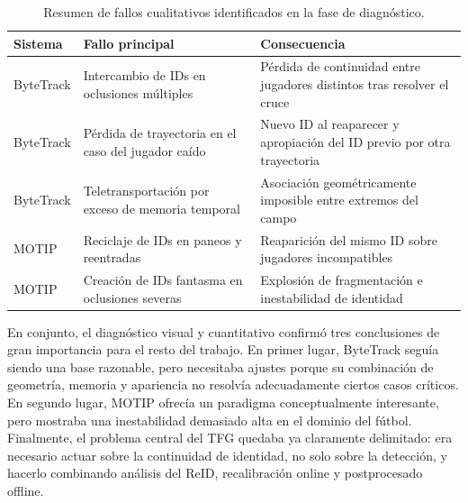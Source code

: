 \documentclass[../MAIN.tex]{subfiles}
\begin{document}
	\begin{table}[H]
		\centering
		\caption{Resumen de fallos cualitativos identificados en la fase de diagnóstico.}
		\label{tab:diagnostico_fallos}
		\begin{tabular}{p{3.2cm}p{4.8cm}p{5.3cm}}
			\toprule
			\textbf{Sistema} & \textbf{Fallo principal} & \textbf{Consecuencia} \\
			\midrule
			ByteTrack & Intercambio de IDs en oclusiones múltiples & Pérdida de continuidad entre jugadores distintos tras resolver el cruce \\
			ByteTrack & Pérdida de trayectoria en el caso del jugador caído & Nuevo ID al reaparecer y apropiación del ID previo por otra trayectoria \\
			ByteTrack & Teletransportación por exceso de memoria temporal & Asociación geométricamente imposible entre extremos del campo \\
			MOTIP & Reciclaje de IDs en paneos y reentradas & Reaparición del mismo ID sobre jugadores incompatibles \\
			MOTIP & Creación de IDs fantasma en oclusiones severas & Explosión de fragmentación e inestabilidad de identidad \\
			\bottomrule
		\end{tabular}
	\end{table}
	
	En conjunto, el diagnóstico visual y cuantitativo confirmó tres conclusiones de gran importancia para el resto del trabajo. En primer lugar, ByteTrack seguía siendo una base razonable, pero necesitaba ajustes porque su combinación de geometría, memoria y apariencia no resolvía adecuadamente ciertos casos críticos. En segundo lugar, MOTIP ofrecía un paradigma conceptualmente interesante, pero mostraba una inestabilidad demasiado alta en el dominio del fútbol. Finalmente, el problema central del TFG quedaba ya claramente delimitado: era necesario actuar sobre la continuidad de identidad, no solo sobre la detección, y hacerlo combinando análisis del ReID, recalibración online y postprocesado offline.
	
	\newpage
	
\end{document}
